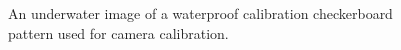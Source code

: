 \begin{figure}[t]
	\centering
	\caption{An underwater image of a waterproof calibration checkerboard pattern used for camera calibration.}
	\label{fig:beauty}
\end{figure}

